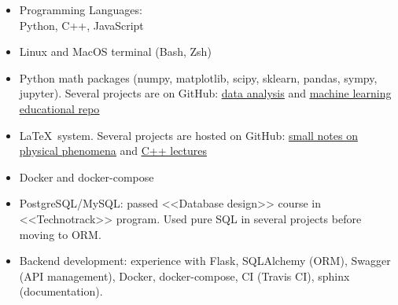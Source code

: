 \begin{itemize}
	\item Programming Languages: \\ 
	Python, C++, JavaScript
	\item Linux and MacOS terminal (Bash, Zsh)
	\item Python math packages 
	(numpy, matplotlib, scipy, sklearn, pandas, sympy, jupyter). Several projects are on GitHub: \href{https://github.com/alekseik1/phys\_labs}{\underline{data analysis}} and \href{https://github.com/alekseik1/machine\_learning\_coursera}{\underline{machine learning educational repo}}
	\item LaTeX~system. Several projects are hosted on GitHub: \href{https://github.com/alekseik1/quest\_on\_choice}{\underline{small notes on physical phenomena}} and \href{https://github.com/alekseik1/cpp\_mipt\_study}{\underline{C++ lectures}}
    \item Docker and docker-compose
    \item PostgreSQL/MySQL: passed <<Database design>> course in <<Technotrack>> program. Used pure SQL in several projects before moving to ORM.
    \item Backend development: experience with Flask, SQLAlchemy (ORM), Swagger (API management), Docker, docker-compose, CI (Travis CI), sphinx (documentation).
\end{itemize}






